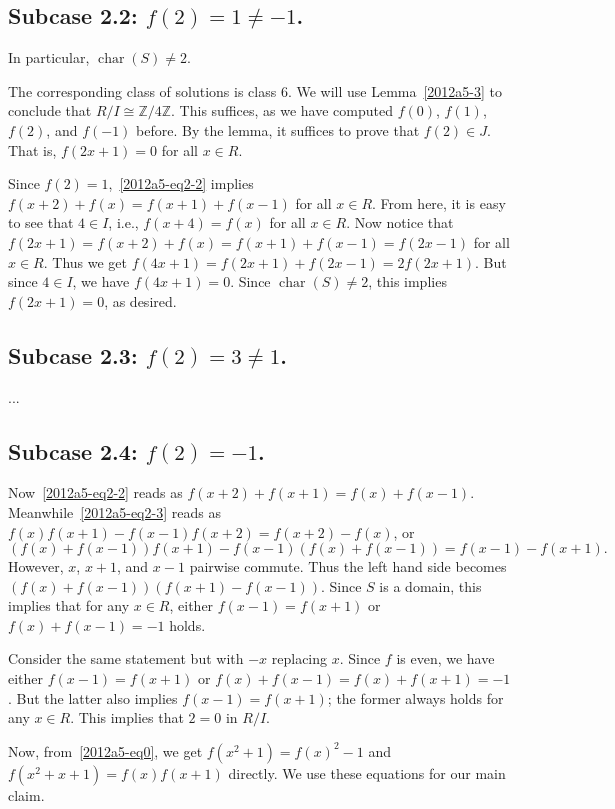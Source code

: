 \documentclass{article}
\newcommand{\Z}{\mathbb{Z}}
\DeclareMathOperator{\rchar}{char}
\begin{document}
\subsection*{Subcase 2.2: $f(2) = 1 \neq -1$.}

In particular, $\rchar(S) \neq 2$.

The corresponding class of solutions is class 6.
We will use Lemma~\ref{2012a5-3} to conclude that $R/I \cong \Z/4\Z$.
This suffices, as we have computed $f(0)$, $f(1)$, $f(2)$, and $f(-1)$ before.
By the lemma, it suffices to prove that $f(2) \in J$.
That is, $f(2x + 1) = 0$ for all $x \in R$.

Since $f(2) = 1$,~\eqref{2012a5-eq2-2} implies $f(x + 2) + f(x) = f(x + 1) + f(x - 1)$ for all $x \in R$.
From here, it is easy to see that $4 \in I$, i.e., $f(x + 4) = f(x)$ for all $x \in R$.
Now notice that $f(2x + 1) = f(x + 2) + f(x) = f(x + 1) + f(x - 1) = f(2x - 1)$ for all $x \in R$.
Thus we get $f(4x + 1) = f(2x + 1) + f(2x - 1) = 2 f(2x + 1)$.
But since $4 \in I$, we have $f(4x + 1) = 0$.
Since $\rchar(S) \neq 2$, this implies $f(2x + 1) = 0$, as desired.


\subsection*{Subcase 2.3: $f(2) = 3 \neq 1$.}

...


\subsection*{Subcase 2.4: $f(2) = -1$.}

Now~\eqref{2012a5-eq2-2} reads as $f(x + 2) + f(x + 1) = f(x) + f(x - 1)$.
Meanwhile~\eqref{2012a5-eq2-3} reads as $f(x) f(x + 1) - f(x - 1) f(x + 2) = f(x + 2) - f(x)$, or
\[ (f(x) + f(x - 1)) f(x + 1) - f(x - 1) (f(x) + f(x - 1)) = f(x - 1) - f(x + 1). \]
However, $x$, $x + 1$, and $x - 1$ pairwise commute.
Thus the left hand side becomes $(f(x) + f(x - 1)) (f(x + 1) - f(x - 1))$.
Since $S$ is a domain, this implies that for any $x \in R$, either $f(x - 1) = f(x + 1)$ or $f(x) + f(x - 1) = -1$ holds.

Consider the same statement but with $-x$ replacing $x$.
Since $f$ is even, we have either $f(x - 1) = f(x + 1)$ or $f(x) + f(x - 1) = f(x) + f(x + 1) = -1$.
But the latter also implies $f(x - 1) = f(x + 1)$; the former always holds for any $x \in R$.
This implies that $2 = 0$ in $R/I$.

Now, from~\eqref{2012a5-eq0}, we get $f(x^2 + 1) = f(x)^2 - 1$ and $f(x^2 + x + 1) = f(x) f(x + 1)$ directly.
We use these equations for our main claim.
\end{document}
